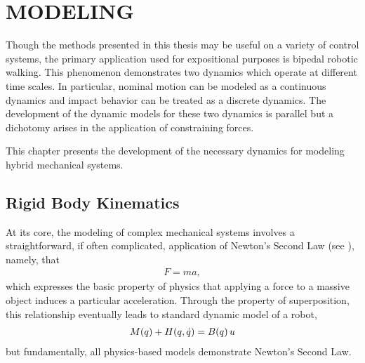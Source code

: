 \chapter{\uppercase{Modeling}}

Though the methods presented in this thesis may be useful on a variety of control systems, the primary application used for expositional purposes is bipedal robotic walking.
%
This phenomenon demonstrates two dynamics which operate at different time scales.
%
In particular, nominal motion can be modeled as a continuous dynamics and impact behavior can be treated as a discrete dynamics.
%
The development of the dynamic models for these two dynamics is parallel but a dichotomy arises in the application of constraining forces.

This chapter presents the development of the necessary dynamics for modeling hybrid mechanical systems.


\section{Rigid Body Kinematics}

At its core, the modeling of complex mechanical systems involves a straightforward, if often complicated, application of Newton's Second Law (see \cite{Feynman1964}), namely,
that
\begin{align}
  \label{eq:newtons-second}
  F = m a,
\end{align}
which expresses the basic property of physics that applying a force to a massive object induces a particular acceleration.
%
Through the property of superposition, this relationship eventually leads to standard dynamic model of a robot,
\begin{align}
  M(q) + H(q, \dot{q}) = B(q) \, u
\end{align}
but fundamentally, all physics-based models demonstrate Newton's Second Law.

